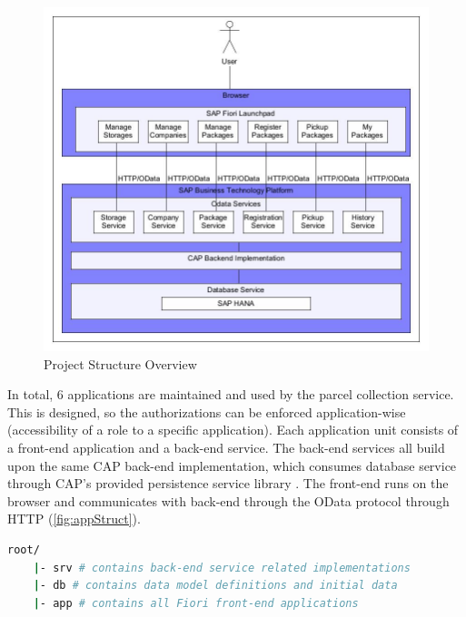\begin{figure}[!htb]
	\centering
	\includegraphics[width=1\linewidth]{images/app_struct_new.jpg}
	\caption{Project Structure Overview}
	\label{fig:appStruct}
\end{figure}

In total, 6 applications are maintained and used by the parcel collection service. This is designed, so the authorizations can be enforced application-wise (accessibility of a role to a specific application). Each application unit consists of a front-end application and a back-end service.
The back-end services all build upon the same CAP back-end implementation, which consumes database service through CAP's provided persistence service library \cite{cap-java-persistencesrv}. The front-end runs on the browser and communicates with back-end through the OData protocol \cite{odata} through HTTP \cite{http} (\autoref{fig:appStruct}). 




\begin{lstlisting}[language={bash}]
root/
    |- srv # contains back-end service related implementations
    |- db # contains data model definitions and initial data
    |- app # contains all Fiori front-end applications
\end{lstlisting}

